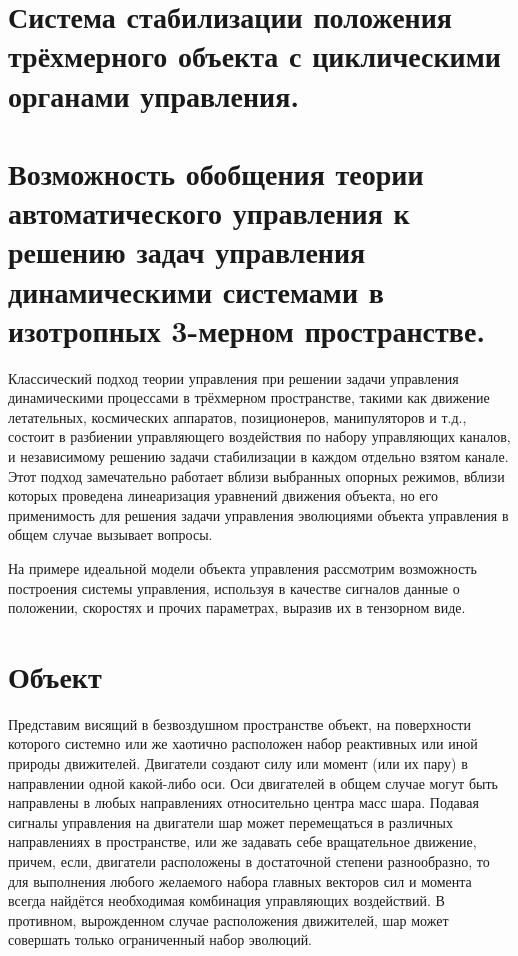 \documentclass[a4paper]{article}
\begin{document}
\section{Система стабилизации положения трёхмерного объекта с циклическими органами управления.}

\section{Возможность обобщения теории автоматического управления к решению задач управления динамическими системами в изотропных 3-мерном пространстве.}
Классический подход теории управления при решении задачи управления динамическими процессами в трёхмерном пространстве, такими как движение летательных, космических аппаратов, позиционеров, манипуляторов и т.д., состоит в разбиении управляющего воздействия по набору управляющих каналов, и независимому решению задачи стабилизации в каждом отдельно взятом канале. Этот подход замечательно работает вблизи выбранных опорных режимов, вблизи которых проведена линеаризация уравнений движения объекта, но его применимость для решения задачи управления эволюциями объекта управления в общем случае вызывает вопросы.

На примере идеальной модели объекта управления рассмотрим возможность построения системы управления, используя в качестве сигналов данные о положении, скоростях и прочих параметрах, выразив их в тензорном виде.

\section{Объект}
Представим висящий в безвоздушном пространстве объект, на поверхности которого системно или же хаотично расположен набор реактивных или иной природы движителей. Двигатели создают силу или момент (или их пару) в направлении одной какой-либо оси. Оси двигателей в общем случае могут быть направлены в любых направлениях относительно центра масс шара. Подавая сигналы управления на двигатели шар может перемещаться в различных направлениях в пространстве, или же задавать себе вращательное движение, причем, если, двигатели расположены в достаточной степени разнообразно, то для выполнения любого желаемого набора главных векторов сил и момента всегда найдётся необходимая комбинация управляющих воздействий. В противном, вырожденном случае расположения движителей, шар может совершать только ограниченный набор эволюций.
\end{document}
